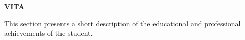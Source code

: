\newpage
{}
{}
\begin{center}
    \large{\bf VITA}
\end{center}

This section presents a short description of the educational and professional
achievements of the student.

